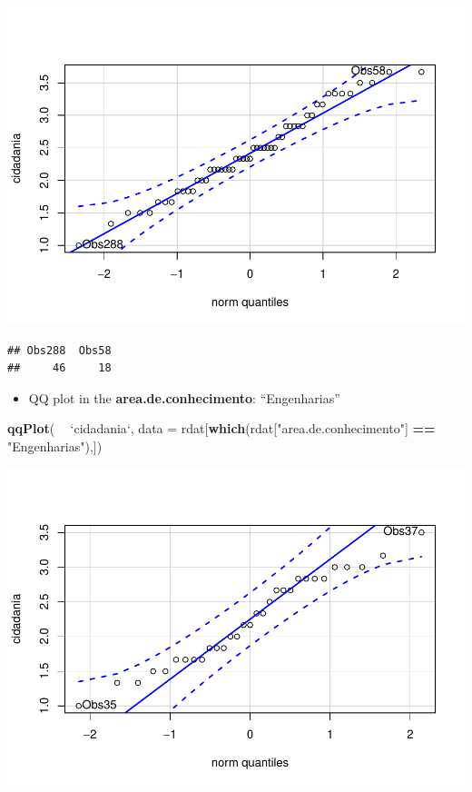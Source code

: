 \documentclass[]{article}
\newenvironment{Shaded}{\begin{snugshade}}{\end{snugshade}}
\newcommand{\DataTypeTok}[1]{\textcolor[rgb]{0.13,0.29,0.53}{#1}}
\newcommand{\KeywordTok}[1]{\textcolor[rgb]{0.13,0.29,0.53}{\textbf{#1}}}
\newcommand{\NormalTok}[1]{#1}
\newcommand{\OperatorTok}[1]{\textcolor[rgb]{0.81,0.36,0.00}{\textbf{#1}}}
\newcommand{\StringTok}[1]{\textcolor[rgb]{0.31,0.60,0.02}{#1}}
\providecommand{\tightlist}{%
  \setlength{\itemsep}{0pt}\setlength{\parskip}{0pt}}
\begin{document}
\includegraphics{factorialAnova_files/figure-latex/unnamed-chunk-14-1.pdf}

\begin{verbatim}
## Obs288  Obs58 
##     46     18
\end{verbatim}

\begin{itemize}
\tightlist
\item
  QQ plot in the \textbf{area.de.conhecimento}: ``Engenharias''
\end{itemize}

\begin{Shaded}
\begin{Highlighting}[]
\KeywordTok{qqPlot}\NormalTok{( }\OperatorTok{~}\StringTok{ `}\DataTypeTok{cidadania}\StringTok{`}\NormalTok{, }\DataTypeTok{data =}\NormalTok{ rdat[}\KeywordTok{which}\NormalTok{(rdat[}\StringTok{"area.de.conhecimento"}\NormalTok{] }\OperatorTok{==}\StringTok{ "Engenharias"}\NormalTok{),])}
\end{Highlighting}
\end{Shaded}

\includegraphics{factorialAnova_files/figure-latex/unnamed-chunk-15-1.pdf}
\end{document}
